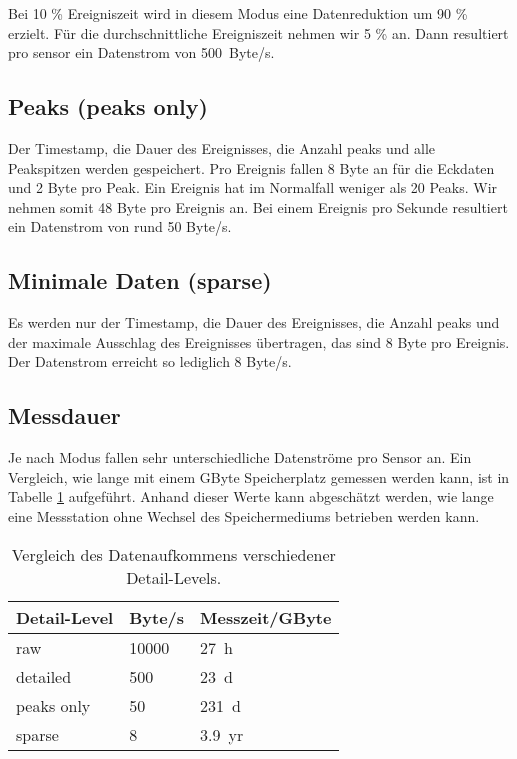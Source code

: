 Bei 10 \% Ereigniszeit wird in diesem Modus eine Datenreduktion um 90 \% erzielt. Für die durchschnittliche Ereigniszeit nehmen wir 5 \% an. Dann resultiert pro \gls{sensor} ein Datenstrom von 500~Byte/s.

\subsection{Peaks (peaks only)}
Der Timestamp, die Dauer des Ereignisses, die Anzahl \glspl{peak} und alle Peakspitzen werden gespeichert. Pro Ereignis fallen 8 Byte an für die Eckdaten und 2 Byte pro Peak. Ein Ereignis hat im Normalfall weniger als 20 Peaks. Wir nehmen somit 48 Byte pro Ereignis an. Bei einem Ereignis pro Sekunde resultiert ein Datenstrom von rund 50 Byte/s.

\subsection{Minimale Daten (sparse)}
Es werden nur der Timestamp, die Dauer des Ereignisses, die Anzahl \glspl{peak} und der maximale Ausschlag des Ereignisses übertragen, das sind 8 Byte pro Ereignis. Der Datenstrom erreicht so lediglich 8 Byte/s.

\subsection{Messdauer}
Je nach Modus fallen sehr unterschiedliche Datenströme pro Sensor an. Ein Vergleich, wie lange mit einem GByte Speicherplatz gemessen werden kann, ist in Tabelle \ref{table.datarate} aufgeführt. Anhand dieser Werte kann abgeschätzt werden, wie lange eine Messstation ohne Wechsel des Speichermediums betrieben werden kann.

\begin{table}
\begin{tabular}{|l|l|l|}
\hline \textbf{Detail-Level} & \textbf{Byte/s} & Messzeit/GByte\\ 
\hline raw                   & 10000 & 27~h \\
\hline detailed              &   500 & 23~d \\
\hline peaks only            &    50 & 231~d \\
\hline sparse                &     8 & 3.9~yr \\
\hline 
\end{tabular}
\caption{Vergleich des Datenaufkommens verschiedener Detail-Levels.}
\label{table.datarate}
\end{table} 

